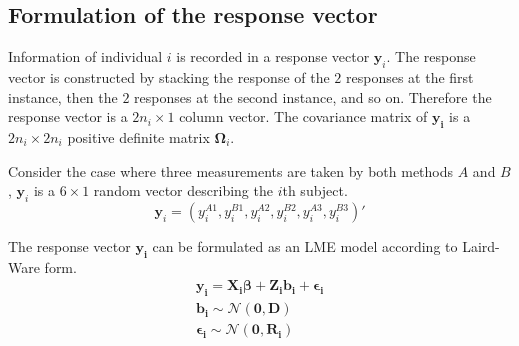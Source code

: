 \documentclass[12pt, a4paper]{report}
\theoremstyle{plain}
\theoremstyle{definition}
\theoremstyle{remark}
\begin{document}





\subsection{Formulation of the response vector}
Information of individual $i$ is recorded in a response vector $\boldsymbol{y}_{i}$. The response vector is constructed by stacking the response of the $2$ responses at the first instance, then the $2$ responses at the second instance, and so on. Therefore the response vector is a $2n_{i} \times 1$ column vector.
The covariance matrix of $\boldsymbol{y_{i}}$ is a $2n_{i} \times 2n_{i}$ positive definite matrix $\boldsymbol{\Omega}_{i}$.

Consider the case where three measurements are taken by both methods $A$ and $B$, $\boldsymbol{y}_{i}$ is a $6 \times 1$ random vector describing the $i$th subject.
\[
\boldsymbol{y}_{i} = (y_{i}^{A1},y_{i}^{B1},y_{i}^{A2},y_{i}^{B2},y_{i}^{A3},y_{i}^{B3}) \prime
\]

The response vector $\boldsymbol{y_{i}}$ can be formulated as an LME model according to Laird-Ware form.
\begin{eqnarray*}
	\boldsymbol{y_{i}} = \boldsymbol{X_{i}\beta}  + \boldsymbol{Z_{i}b_{i}} + \boldsymbol{\epsilon_{i}}\\
	\boldsymbol{b_{i}} \sim \mathcal{N}(\boldsymbol{0,D})\\
	\boldsymbol{\epsilon_{i}} \sim \mathcal{N}(\boldsymbol{0,R_{i}})
\end{eqnarray*}
\end{document}
